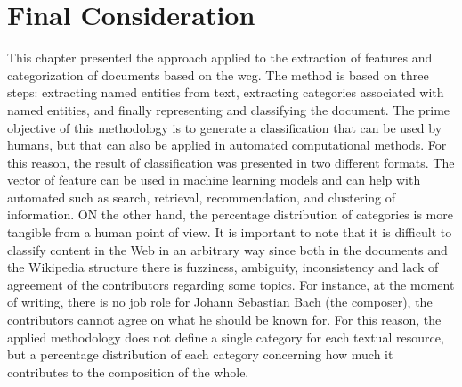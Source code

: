 \section{\hspace*{3pt} Final Consideration}

This chapter presented the approach applied to the extraction of features and categorization of documents based on the \gls{wcg}. The method is based on three steps: extracting named entities from text, extracting categories associated with named entities, and finally representing and classifying the document.
The prime objective of this methodology is to generate a classification that can be used by humans, but that can also be applied in automated computational methods. For this reason, the result of classification was presented in two different formats. The vector of feature can be used in machine learning models and can help with automated such as search, retrieval, recommendation, and clustering of information. ON the other hand, the percentage distribution of categories is more tangible from a human point of view.
It is important to note that it is difficult to classify content in the Web in an arbitrary way since both in the documents and the Wikipedia structure there is fuzziness, ambiguity, inconsistency and lack of agreement of the contributors regarding some topics. For instance, at the moment of writing, there is no job role for Johann Sebastian Bach (the composer), the contributors cannot agree on what he should be known for. For this reason, the applied methodology does not define a single category for each textual resource, but a percentage distribution of each category concerning how much it contributes to the composition of the whole.